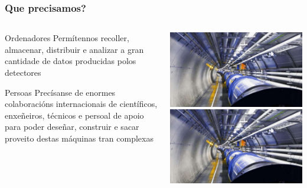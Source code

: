 \documentclass{beamer}
\begin{document}
\begin{frame}
  \frametitle{Que precisamos?}

  \begin{columns}
  \begin{column}{0.45\textwidth}

    \begin{block}{Ordenadores}
    Permítennos recoller, almacenar, distribuir e analizar a gran cantidade de
    datos producidas polos detectores
    \end{block}

    \begin{block}{Persoas}
    Precísanse de enormes colaboracións internacionais de científicos, 
    enxeñeiros, técnicos e persoal de apoio para poder deseñar, construir e 
    sacar proveito destas máquinas tran complexas
    \end{block}
  \end{column}

  \begin{column}{0.45\textwidth}
    \includegraphics[width=\columnwidth, page=4]{gpx/examples.pdf}\\[5mm]
    \includegraphics[width=\columnwidth, page=2]{gpx/examples.pdf}
  \end{column}
  \end{columns}

\end{frame}
\end{document}
